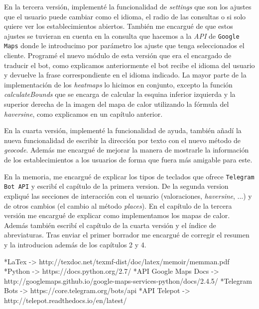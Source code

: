 \documentclass[oneside]{memoir}
\begin{document}
En la tercera versión, implementé la funcionalidad de \textit{settings} que son los ajustes que el usuario puede cambiar como el idioma, el radio de las consultas o si solo quiere ver los establecimientos abiertos. También me encargué de que estos ajustes se tuvieran en cuenta en la consulta que hacemos a la \textit{API} de \texttt{Google Maps} donde le introducimo por parámetro los ajuste que tenga seleccionados el cliente. Programé el nuevo módulo de esta versión que era el encargado de traducir el bot, como explicamos anteriormente el bot recibe el idioma del usuario y devuelve la frase correspondiente en el idioma indicado. La mayor parte de la implementación de los \textit{heatmaps} lo hicimos en conjunto, excepto la función \textit{calculateBounds} que se encarga de calcular la esquina inferior izquierda y la superior derecha de la imagen del mapa de calor utilizando la fórmula del \textit{haversine}, como explicamos en un capítulo anterior.

En la cuarta versión, implementé la funcionalidad de ayuda, también añadí la nueva funcionalidad de escribir la dirección por texto con el nuevo método de \textit{geocode}. Además me encargué de mejorar la manera de mostrarle la información de los establecimientos a los usuarios de forma que fuera más amigable para este.

En la memoria, me encargué de explicar los tipos de teclados que ofrece \texttt{Telegram Bot API} y escribí el capítulo de la primera version. De la segunda version expliqué las secciones de interacción con el usuario (valoraciones, \textit{haversine}, ...) y de otros cambios (el cambio al método \textit{places}). En el capítulo de la tercera versión me encargué de explicar como implementamos los mapas de calor. Además también escribí el capítulo de la cuarta versión y el índice de abreviaturas. Tras enviar el primer borrador me encargué de corregir el resumen y la introducion además de los capítulos 2 y 4.

\newpage
\begin{thebibliography}{}
\bibitem
*LaTex -> http://texdoc.net/texmf-dist/doc/latex/memoir/memman.pdf 
\bibitem
*Python -> https://docs.python.org/2.7/
\bibitem
*API Google Maps Docs -> http://googlemaps.github.io/google-maps-services-python/docs/2.4.5/
\bibitem
*Telegram Bots -> https://core.telegram.org/bots/api
\bibitem
*API Telepot -> http://telepot.readthedocs.io/en/latest/
\end{thebibliography}
\end{document}
